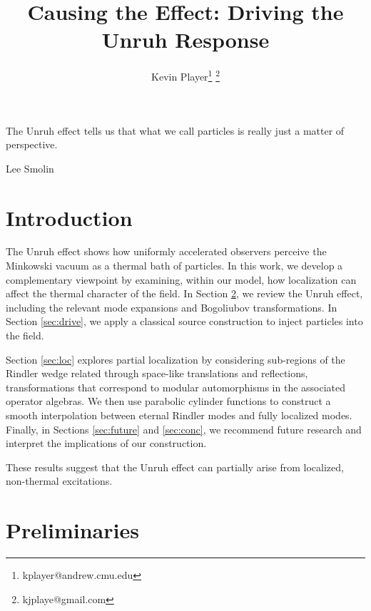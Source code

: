 \documentclass[12pt,a4paper]{article}
\begin{document}
\title{Causing the Effect: Driving the Unruh Response}
\author[1]{Kevin Player\footnote{kplayer@andrew.cmu.edu} \footnote{kjplaye@gmail.com}}

\maketitle

\epigraph{The Unruh effect tells us that what we call particles is really just a matter of perspective.}{Lee Smolin}


\section{Introduction}
The Unruh effect\cite{unruh1976notes} shows how uniformly accelerated observers perceive the Minkowski vacuum as a thermal bath of particles. In this work, we develop a complementary viewpoint by examining, within our model, how localization can affect the thermal character of the field. In Section \ref{sec:prelim}, we review the Unruh effect, including the relevant mode expansions and Bogoliubov transformations. In Section \ref{sec:drive}, we apply a classical source construction to inject particles into the field.

Section \ref{sec:loc} explores partial localization by considering sub-regions of the Rindler wedge related through space-like translations and reflections, transformations that correspond to modular automorphisms in the associated operator algebras. We then use parabolic cylinder functions to construct a smooth interpolation between eternal Rindler modes and fully localized modes. Finally, in Sections \ref{sec:future} and \ref{sec:conc}, we recommend future research and interpret the implications of our construction.

These results suggest that the Unruh effect can partially arise from localized, non-thermal excitations.

\section{Preliminaries} \label{sec:prelim}
\end{document}

